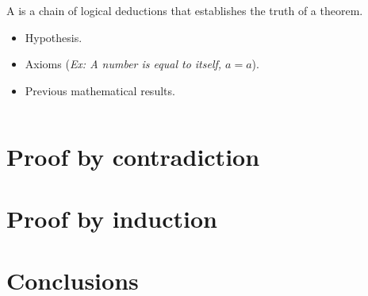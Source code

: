 \documentclass[11pt,a4paper,xcolor=dvipsnames, leqno]{beamer}
\begin{document}
\begin{frame}
A  is a chain of logical deductions that establishes the truth of a theorem.
\begin{itemize}
\item<2-> Hypothesis.
\item<2-> Axioms (\emph{Ex: A number is equal to itself, $a = a$}).
\item<2-> Previous mathematical results.
\end{itemize}
\begin{columns}
\begin{column}{0.5\textwidth}
\vspace*{-0.1cm}
\end{column}
\begin{column}{0.5\textwidth}
\end{column}
\end{columns}

\end{frame}

\section{Proof by contradiction}

\section{Proof by induction}
\section{Conclusions}
\end{document}
